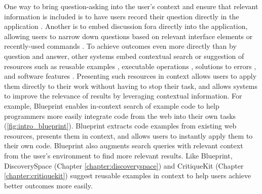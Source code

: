 One way to bring question-asking into the user's context and ensure that relevant information is included is to have users record their question directly in the application \cite{Chen2017}. Another is to embed discussion fora directly into the application, allowing users to narrow down questions based on relevant interface elements \cite{Chilana2012} or recently-used commands \cite{Matejka2011a}. To achieve outcomes even more directly than by question and answer, other systems embed contextual search or suggestion of resources such as reusable examples \cite{Brandt2010}, executable operations \cite{Kandel2011}, solutions to errors \cite{Hartmann2010}, and software features \cite{Adar2014}. Presenting such resources in context allows users to apply them directly to their work without having to stop their task, and allows systems to improve the relevance of results by leveraging contextual information. 
For example, Blueprint \cite{Brandt2010} enables in-context search of example code to help programmers more easily integrate code from the web into their own tasks (\autoref{fig:intro_blueprint}). Blueprint extracts code examples from existing web resources, presents them in context, and allows users to instantly apply them to their own code. Blueprint also augments search queries with relevant context from the user's environment to find more relevant results.
Like Blueprint, DiscoverySpace (Chapter \ref{chapter:discoveryspace}) and CritiqueKit (Chapter \ref{chapter:critiquekit}) suggest reusable examples in context to help users achieve better outcomes more easily.

